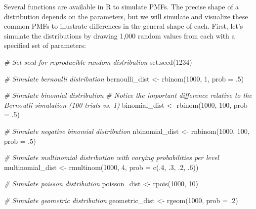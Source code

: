 \documentclass[
]{book}
\newenvironment{Shaded}{\begin{snugshade}}{\end{snugshade}}
\newcommand{\AttributeTok}[1]{\textcolor[rgb]{0.77,0.63,0.00}{#1}}
\newcommand{\CommentTok}[1]{\textcolor[rgb]{0.56,0.35,0.01}{\textit{#1}}}
\newcommand{\DecValTok}[1]{\textcolor[rgb]{0.00,0.00,0.81}{#1}}
\newcommand{\FunctionTok}[1]{\textcolor[rgb]{0.00,0.00,0.00}{#1}}
\newcommand{\NormalTok}[1]{#1}
\newcommand{\OtherTok}[1]{\textcolor[rgb]{0.56,0.35,0.01}{#1}}
\begin{document}
Several functions are available in R to simulate PMFs. The precise shape of a distribution depends on the parameters, but we will simulate and visualize these common PMFs to illustrate differences in the general shape of each. First, let's simulate the distributions by drawing 1,000 random values from each with a specified set of parameters:

\begin{Shaded}
\begin{Highlighting}[]
\CommentTok{\# Set seed for reproducible random distribution}
\FunctionTok{set.seed}\NormalTok{(}\DecValTok{1234}\NormalTok{)}

\CommentTok{\# Simulate bernoulli distribution}
\NormalTok{bernoulli\_dist }\OtherTok{\textless{}{-}} \FunctionTok{rbinom}\NormalTok{(}\DecValTok{1000}\NormalTok{, }\DecValTok{1}\NormalTok{, }\AttributeTok{prob =}\NormalTok{ .}\DecValTok{5}\NormalTok{)}

\CommentTok{\# Simulate binomial distribution}
\CommentTok{\# Notice the important difference relative to the Bernoulli simulation (100 trials vs. 1)}
\NormalTok{binomial\_dist }\OtherTok{\textless{}{-}} \FunctionTok{rbinom}\NormalTok{(}\DecValTok{1000}\NormalTok{, }\DecValTok{100}\NormalTok{, }\AttributeTok{prob =}\NormalTok{ .}\DecValTok{5}\NormalTok{) }

\CommentTok{\# Simulate negative binomial distribution}
\NormalTok{nbinomial\_dist }\OtherTok{\textless{}{-}} \FunctionTok{rnbinom}\NormalTok{(}\DecValTok{1000}\NormalTok{, }\DecValTok{100}\NormalTok{, }\AttributeTok{prob =}\NormalTok{ .}\DecValTok{5}\NormalTok{) }

\CommentTok{\# Simulate multinomial distribution with varying probabilities per level}
\NormalTok{multinomial\_dist }\OtherTok{\textless{}{-}} \FunctionTok{rmultinom}\NormalTok{(}\DecValTok{1000}\NormalTok{, }\DecValTok{4}\NormalTok{, }\AttributeTok{prob =} \FunctionTok{c}\NormalTok{(.}\DecValTok{4}\NormalTok{, .}\DecValTok{3}\NormalTok{, .}\DecValTok{2}\NormalTok{, .}\DecValTok{6}\NormalTok{))}

\CommentTok{\# Simulate poisson distribution}
\NormalTok{poisson\_dist }\OtherTok{\textless{}{-}} \FunctionTok{rpois}\NormalTok{(}\DecValTok{1000}\NormalTok{, }\DecValTok{10}\NormalTok{) }

\CommentTok{\# Simulate geometric distribution}
\NormalTok{geometric\_dist }\OtherTok{\textless{}{-}} \FunctionTok{rgeom}\NormalTok{(}\DecValTok{1000}\NormalTok{, }\AttributeTok{prob =}\NormalTok{ .}\DecValTok{2}\NormalTok{) }
\end{Highlighting}
\end{Shaded}
\end{document}
